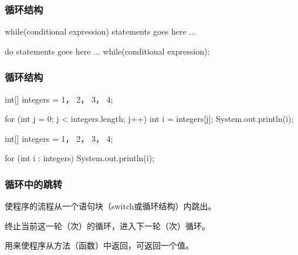 \begin{frame}[fragile]
  \frametitle{循环结构}


  \begin{javaCode}
    while(conditional expression) {
      statements goes here ...
    }
  \end{javaCode}


  \begin{javaCode}
    do {
      statements goes here ...
    }
    while(conditional expression);
  \end{javaCode}
\end{frame}



\begin{frame}[fragile]
  \frametitle{循环结构}


  \begin{javaCode}
    int[] integers = {1， 2， 3， 4};

    for (int j = 0; j < integers.length; j++) {
      int i = integers[j];
      System.out.println(i);
    } 
  \end{javaCode}


  \begin{javaCode}
    int[] integers = {1， 2， 3， 4};

    for (int i : integers) {
      System.out.println(i);
    }
  \end{javaCode}
\end{frame}

\begin{frame}[fragile]
  \frametitle{循环中的跳转}
  \begin{description}\kai
  \item[break语句] 使程序的流程从一个语句块（switch或循环结构）内跳出。
  \item[continue语句] 终止当前这一轮（次）的循环，进入下一轮（次）循环。
  \item[return语句] 用来使程序从方法（函数）中返回，可返回一个值。
  \end{description}
\end{frame}

